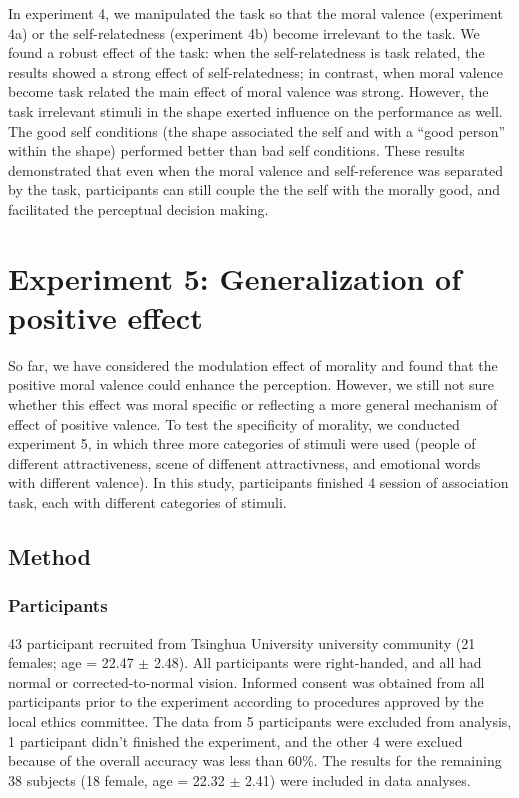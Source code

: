 \documentclass[man]{apa6}
\begin{document}
In experiment 4, we manipulated the task so that the moral valence (experiment 4a) or the self-relatedness (experiment 4b) become irrelevant to the task. We found a robust effect of the task: when the self-relatedness is task related, the results showed a strong effect of self-relatedness; in contrast, when moral valence become task related the main effect of moral valence was strong. However, the task irrelevant stimuli in the shape exerted influence on the performance as well. The good self conditions (the shape associated the self and with a \enquote{good person} within the shape) performed better than bad self conditions. These results demonstrated that even when the moral valence and self-reference was separated by the task, participants can still couple the the self with the morally good, and facilitated the perceptual decision making.

\hypertarget{experiment-5-generalization-of-positive-effect}{%
\section{Experiment 5: Generalization of positive effect}\label{experiment-5-generalization-of-positive-effect}}

So far, we have considered the modulation effect of morality and found that the positive moral valence could enhance the perception. However, we still not sure whether this effect was moral specific or reflecting a more general mechanism of effect of positive valence. To test the specificity of morality, we conducted experiment 5, in which three more categories of stimuli were used (people of different attractiveness, scene of diffenent attractivness, and emotional words with different valence). In this study, participants finished 4 session of association task, each with different categories of stimuli.

\hypertarget{method-6}{%
\subsection{Method}\label{method-6}}

\hypertarget{participants-8}{%
\subsubsection{Participants}\label{participants-8}}

43 participant recruited from Tsinghua University university community (21 females; age = 22.47 \(\pm\) 2.48). All participants were right-handed, and all had normal or corrected-to-normal vision. Informed consent was obtained from all participants prior to the experiment according to procedures approved by the local ethics committee. The data from 5 participants were excluded from analysis, 1 participant didn't finished the experiment, and the other 4 were exclued because of the overall accuracy was less than 60\%. The results for the remaining 38 subjects (18 female, age = 22.32 \(\pm\) 2.41) were included in data analyses.
\end{document}
